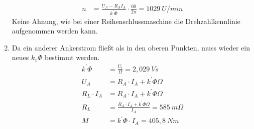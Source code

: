 \begin{solution}
\begin{enumerate}
\begin{align}
n&= \frac{U_A - R_A I_A}{k^{'} \Phi} \cdot \frac{60}{2 \pi} = 1029~U/min
\end{align}
Keine Ahnung, wie bei einer Reihenschlussmaschine die Drehzahlkennlinie aufgenommen werden kann.
\item Da ein anderer Ankerstrom fließt als in den oberen Punkten, muss wieder ein neues $k_1 \Phi$ bestimmt werden.
\begin{align}
k^{'} \Phi &= \frac{U_i}{\Omega} = 2,029~Vs\\
U_A &= R_A \cdot I_A + k^{'} \Phi \Omega\\
R_L \cdot I_A &= R_A \cdot I_A + k^{'} \Phi \Omega\\
R_L &= \frac{R_A \cdot I_A + k^{'} \Phi \Omega}{I_A}=585~m\Omega\\
M &= k^{'} \Phi \cdot I_A = 405,8~Nm
\end{align}
\end{enumerate}
\end{solution}
